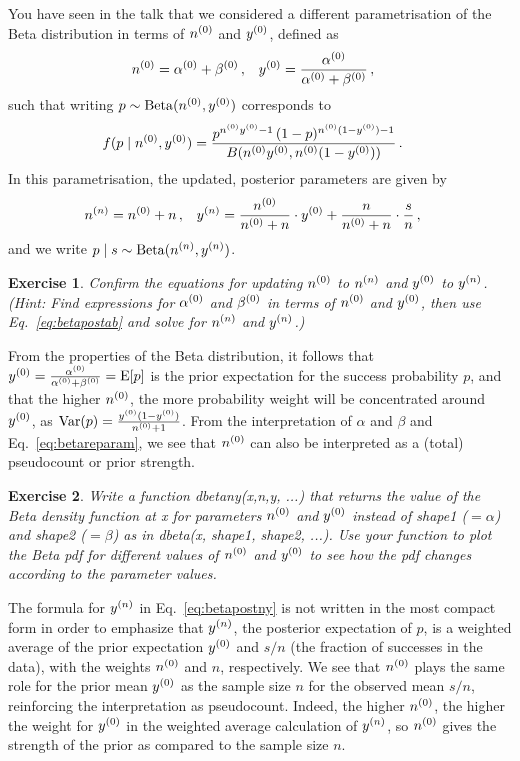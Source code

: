 \documentclass[12pt,a4paper	,twoside]{article}
\newcommand{\E}{\operatorname{E}}
\newcommand{\V}{\operatorname{Var}}
\newcommand{\be}{\operatorname{Beta}}
\newcommand{\code}[1]{\emph{\ttfamily #1}}
\newtheorem{myex}{Exercise}
\begin{document}
You have seen in the talk that we considered a different parametrisation of the Beta distribution
in terms of $n^{(0)}$ and $y^{(0)}$, defined as
\begin{align}
n^{(0)} &= \alpha^{(0)} + \beta^{(0)}\,, & y^{(0)} &= \frac{\alpha^{(0)}}{\alpha^{(0)}+\beta^{(0)}}\,,
\label{eq:betareparam}
\end{align}
such that writing $p \sim \be(\nz,\yz)$ corresponds to
\begin{align}
f(p\mid n^{(0)},y^{(0)}) &= \frac{p^{n^{(0)}y^{(0)}-1}\, (1-p)^{n^{(0)}(1-y^{(0)})-1}}{B(n^{(0)}y^{(0)},n^{(0)}(1-y^{(0)}))}\,.
\label{eq:betadensny}
\end{align}
In this parametrisation, the updated, posterior parameters are given by
\begin{align}
n^{(n)} &= n^{(0)} + n\,, &
y^{(n)} &= \frac{n^{(0)}}{n^{(0)} + n} \cdot y^{(0)} + \frac{n}{n^{(0)} + n} \cdot \frac{s}{n}\,,
\label{eq:betapostny}
\end{align}
and we write $p\mid s \sim \be(\nn,\yn)$.

\begin{myex}
Confirm the equations for updating $n^{(0)}$ to $n^{(n)}$ and $y^{(0)}$ to $y^{(n)}$.
(Hint: Find expressions for $\alpha^{(0)}$ and $\beta^{(0)}$ in terms of $n^{(0)}$ and $y^{(0)}$,
then use Eq.~\eqref{eq:betapostab} and solve for $n^{(n)}$ and $y^{(n)}$.)
\end{myex}

From the properties of the Beta distribution,
it follows that $\yz = \frac{\az}{\az+\bz} = \E[p]$
is the prior expectation for the success probability $p$,
and that the higher $n^{(0)}$, the more probability weight will be concentrated around $y^{(0)}$,
as $\V(p) = \frac{\yz (1-\yz)}{\nz + 1}$.
From the interpretation of $\alpha$ and $\beta$ and Eq.~\eqref{eq:betareparam},
we see that $n^{(0)}$ can also be interpreted as a (total) pseudocount or prior strength.

\begin{myex}\label{ex:dbetany}
Write a function \code{dbetany(x,n,y, ...)}
that returns the value of the Beta density function at \code{x}
for parameters $n^{(0)}$ and $y^{(0)}$ instead of \code{shape1} ($=\alpha$) and \code{shape2} ($=\beta$)
as in \code{dbeta(x, shape1, shape2, ...)}.
Use your function to plot the Beta pdf for different values of $n^{(0)}$ and $y^{(0)}$
to see how the pdf changes according to the parameter values.
\end{myex}

The formula for $y^{(n)}$ in Eq.~\eqref{eq:betapostny} is not written in the most compact form
in order to emphasize that $y^{(n)}$, the posterior expectation of $p$,
is a weighted average of the prior expectation $y^{(0)}$ and $s/n$ (the fraction of successes in the data),
with the weights $n^{(0)}$ and $n$, respectively.
We see that $n^{(0)}$ plays the same role for the prior mean $y^{(0)}$
as the sample size $n$ for the observed mean $s/n$,
reinforcing the interpretation as pseudocount.
Indeed, the higher $n^{(0)}$, the higher the weight for $y^{(0)}$
in the weighted average calculation of $y^{(n)}$,
so $n^{(0)}$ gives the strength of the prior as compared to the sample size $n$.
\end{document}
